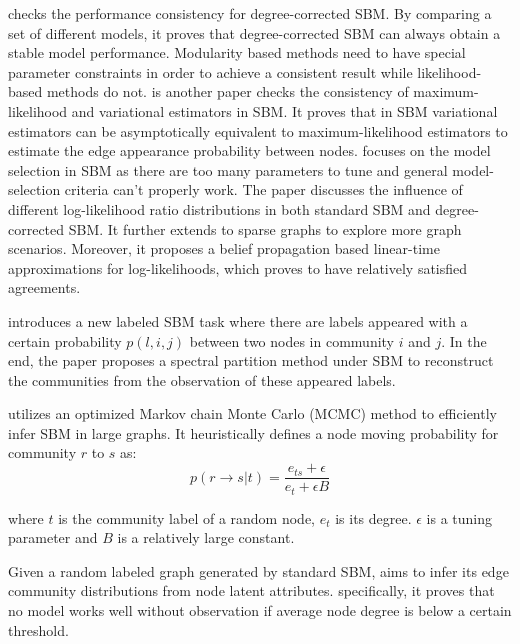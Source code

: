 \cite{zhao2012consistency} checks the performance consistency for degree-corrected SBM. By comparing a set of different models, it proves that degree-corrected SBM can always obtain a stable model performance. Modularity based methods need to have special parameter constraints in order to achieve a consistent result while likelihood-based methods do not. \cite{celisse2012consistency} is another paper checks the consistency of maximum-likelihood and variational estimators in SBM. It proves that in SBM variational estimators can be asymptotically equivalent to maximum-likelihood estimators to estimate the edge appearance probability between nodes. \cite{yan2014model} focuses on the model selection in SBM as there are too many parameters to tune and general model-selection criteria can't properly work. The paper discusses the influence of different log-likelihood ratio distributions in both standard SBM and degree-corrected SBM. It further extends to sparse graphs to explore more graph scenarios. Moreover, it proposes a belief propagation based linear-time approximations for log-likelihoods, which proves to have relatively satisfied agreements. 

\cite{yun2016optimal} introduces a new labeled SBM task where there are labels appeared with a certain probability $p(l,i,j)$ between two nodes in community $i$ and $j$. In the end, the paper proposes a spectral partition method under SBM to reconstruct the communities from the observation of these appeared labels. 

\cite{peixoto2014efficient} utilizes an optimized Markov chain Monte Carlo (MCMC) method to efficiently infer SBM in large graphs. It heuristically defines a node moving probability for community $r$ to $s$ as:
\begin{equation}
p(r \rightarrow s| t) = \frac{e_{ts}+ \epsilon}{e_{t} + \epsilon B}
\end{equation}

where $t$ is the community label of a random node, $e_{t}$ is its degree. $\epsilon$ is a tuning parameter and $B$ is a relatively large constant. 

Given a random labeled graph generated by standard SBM, \cite{xu2014edge} aims to infer its edge community distributions from node latent attributes. specifically, it proves that no model works well without observation if average node degree is below a certain threshold.  

